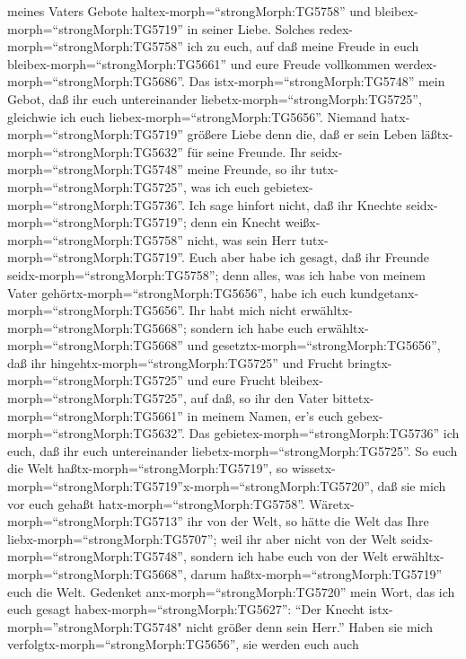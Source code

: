 meines Vaters Gebote haltex-morph=``strongMorph:TG5758'' und
bleibex-morph=``strongMorph:TG5719'' in seiner Liebe. 
Solches redex-morph=``strongMorph:TG5758'' ich zu euch, auf daß meine
Freude in euch bleibex-morph=``strongMorph:TG5661'' und eure Freude
vollkommen werdex-morph=``strongMorph:TG5686''.  Das
istx-morph=``strongMorph:TG5748'' mein Gebot, daß ihr euch untereinander
liebetx-morph=``strongMorph:TG5725'', gleichwie ich euch
liebex-morph=``strongMorph:TG5656''.  Niemand
hatx-morph=``strongMorph:TG5719'' größere Liebe denn die, daß er sein
Leben läßtx-morph=``strongMorph:TG5632'' für seine Freunde.
 Ihr seidx-morph=``strongMorph:TG5748'' meine Freunde, so
ihr tutx-morph=``strongMorph:TG5725'', was ich euch
gebietex-morph=``strongMorph:TG5736''.  Ich sage hinfort
nicht, daß ihr Knechte seidx-morph=``strongMorph:TG5719''; denn ein
Knecht weißx-morph=``strongMorph:TG5758'' nicht, was sein Herr
tutx-morph=``strongMorph:TG5719''. Euch aber habe ich gesagt, daß ihr
Freunde seidx-morph=``strongMorph:TG5758''; denn alles, was ich habe von
meinem Vater gehörtx-morph=``strongMorph:TG5656'', habe ich euch
kundgetanx-morph=``strongMorph:TG5656''.  Ihr habt mich
nicht erwähltx-morph=``strongMorph:TG5668''; sondern ich habe euch
erwähltx-morph=``strongMorph:TG5668'' und
gesetztx-morph=``strongMorph:TG5656'', daß ihr
hingehtx-morph=``strongMorph:TG5725'' und Frucht
bringtx-morph=``strongMorph:TG5725'' und eure Frucht
bleibex-morph=``strongMorph:TG5725'', auf daß, so ihr den Vater
bittetx-morph=``strongMorph:TG5661'' in meinem Namen, er's euch
gebex-morph=``strongMorph:TG5632''.  Das
gebietex-morph=``strongMorph:TG5736'' ich euch, daß ihr euch
untereinander liebetx-morph=``strongMorph:TG5725''.  So
euch die Welt haßtx-morph=``strongMorph:TG5719'', so
wissetx-morph=``strongMorph:TG5719''\textbar x-morph=``strongMorph:TG5720'',
daß sie mich vor euch gehaßt hatx-morph=``strongMorph:TG5758''.
 Wäretx-morph=``strongMorph:TG5713'' ihr von der Welt, so
hätte die Welt das Ihre liebx-morph=``strongMorph:TG5707''; weil ihr
aber nicht von der Welt seidx-morph=``strongMorph:TG5748'', sondern ich
habe euch von der Welt erwähltx-morph=``strongMorph:TG5668'', darum
haßtx-morph=``strongMorph:TG5719'' euch die Welt.  Gedenket
anx-morph=``strongMorph:TG5720'' mein Wort, das ich euch gesagt
habex-morph=``strongMorph:TG5627'': ``Der Knecht
istx-morph=''strongMorph:TG5748" nicht größer denn sein Herr.'' Haben
sie mich verfolgtx-morph=``strongMorph:TG5656'', sie werden euch auch
